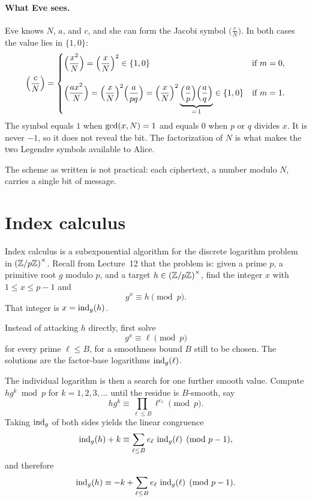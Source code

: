 \paragraph{What Eve sees.}
Eve knows \(N\), \(a\), and \(c\), and she can form the Jacobi symbol
\(\bigl(\frac{c}{N}\bigr)\). In both cases the value lies in \(\{1,0\}\):
\[
    \Bigl(\frac{c}{N}\Bigr)
    =
    \begin{cases}
        \Bigl(\dfrac{x^{2}}{N}\Bigr)
            =\Bigl(\dfrac{x}{N}\Bigr)^{2}
            \in\{1,0\} & \text{if }m=0,\\[1.6em]
        \Bigl(\dfrac{ax^{2}}{N}\Bigr)
            =\Bigl(\dfrac{x}{N}\Bigr)^{2}\Bigl(\dfrac{a}{pq}\Bigr)
            =\Bigl(\dfrac{x}{N}\Bigr)^{2}
            \underbrace{\Bigl(\dfrac{a}{p}\Bigr)\Bigl(\dfrac{a}{q}\Bigr)}_{=\,1}
            \in\{1,0\} & \text{if }m=1.
    \end{cases}
\]
The symbol equals \(1\) when \(\operatorname{gcd}(x,N)=1\) and equals \(0\) when \(p\) or
\(q\) divides \(x\). It is never \(-1\), so it does not reveal the bit.
The factorization of \(N\) is what makes the two Legendre symbols available
to Alice.


\begin{remark}
The scheme as written is not practical: each ciphertext, a number modulo
\(N\), carries a single bit of message.
\end{remark}

\section{Index calculus}
\label{sec:index-calculus}

Index calculus is a subexponential algorithm for the discrete logarithm
problem in \(\left(\mathbb Z/p\mathbb Z\right)^\times\). Recall from Lecture~12 that the problem is: given a prime \(p\), a primitive
root \(g\) modulo \(p\), and a target \(h\in\left(\mathbb Z/p\mathbb Z\right)^\times\), find the integer
\(x\) with \(1\le x\le p-1\) and
\[
    g^{x}\equiv h\pmod{p}.
\]
That integer is \(x=\operatorname{ind}_{g}(h)\).

Instead of attacking \(h\) directly, first solve
\[
    g^{x}\equiv \ell\pmod{p}
\]
for every prime \(\ell\le B\), for a smoothness bound \(B\) still to be
chosen. The solutions are the factor-base logarithms \(\operatorname{ind}_{g}(\ell)\).

The individual logarithm is then a search for one further smooth value.
Compute \(hg^{k}\bmod p\) for \(k=1,2,3,\ldots\) until the residue is
\(B\)-smooth, say
\[
    hg^{k}
    \equiv\prod_{\ell\le B}\ell^{e_{\ell}}\pmod{p}.
\]
Taking \(\operatorname{ind}_{g}\) of both sides yields the linear congruence
\[
    \operatorname{ind}_{g}(h)+k
    \equiv\sum_{\ell\le B}e_{\ell}\,\operatorname{ind}_{g}(\ell)
    \pmod{p-1},
\]
and therefore
\[
    \operatorname{ind}_{g}(h)
    \equiv -k+\sum_{\ell\le B}e_{\ell}\,\operatorname{ind}_{g}(\ell)
    \pmod{p-1}.
\]


